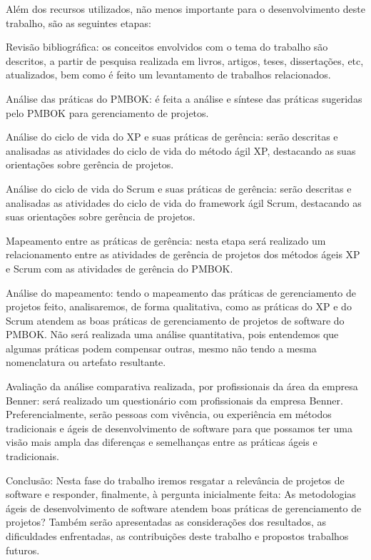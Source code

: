 \documentclass[
    12pt,               %
    openright,          %
    twoside,            %
    a4paper,            %
    chapter=TITLE,     %
    english,            %
    spanish,            %
    portuguese              %
    ]{abntex2}
\begin{document}
Além dos recursos utilizados, não menos importante para o desenvolvimento deste trabalho, são as seguintes etapas: 

\begin{alineas}	
	\item Revisão bibliográfica: os conceitos envolvidos com o tema do trabalho são descritos, a partir de pesquisa realizada em livros, artigos, teses, dissertações, etc, atualizados, bem como é feito um levantamento de trabalhos relacionados.
	\item Análise das práticas do PMBOK: é feita a análise e síntese das práticas sugeridas pelo PMBOK para gerenciamento de projetos.
	\item Análise do ciclo de vida do XP e suas práticas de gerência: serão descritas e analisadas as atividades  do ciclo de vida do método ágil XP, destacando as suas orientações sobre gerência de projetos.
	\item Análise do ciclo de vida do Scrum e suas práticas de gerência: serão descritas e analisadas as atividades do ciclo de vida do framework ágil Scrum, destacando as suas orientações sobre gerência de projetos.
	\item Mapeamento entre as práticas de gerência: nesta etapa será realizado um relacionamento entre as atividades de gerência de projetos dos métodos ágeis XP e Scrum com as atividades de gerência do PMBOK.
	\item Análise do mapeamento: tendo o mapeamento das práticas de gerenciamento de projetos feito, analisaremos, de forma qualitativa, como as práticas do XP e do Scrum atendem as boas práticas de gerenciamento de projetos de software do PMBOK. Não será realizada uma análise quantitativa, pois entendemos que algumas práticas podem compensar outras, mesmo não tendo a mesma nomenclatura ou artefato resultante.
	\item Avaliação da análise comparativa realizada, por profissionais da área da empresa Benner: será realizado um questionário com profissionais da empresa Benner. Preferencialmente, serão pessoas com vivência, ou experiência em métodos tradicionais e ágeis de desenvolvimento de software para que possamos ter uma visão mais ampla das diferenças e semelhanças entre as práticas ágeis e tradicionais.
	\item Conclusão: Nesta fase do trabalho iremos resgatar a relevância de projetos de software e responder, finalmente, à pergunta inicialmente feita: As metodologias ágeis de desenvolvimento de software atendem boas práticas de gerenciamento de projetos? Também serão apresentadas as considerações dos resultados, as dificuldades enfrentadas, as contribuições deste trabalho e propostos trabalhos futuros.
\end{alineas}
\end{document}
